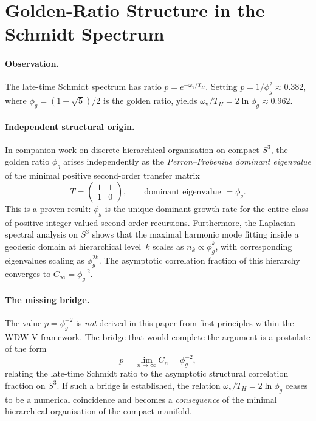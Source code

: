 \documentclass[12pt,a4paper]{article}
\theoremstyle{plain}
\theoremstyle{definition}
\newcommand{\omv}{\omega_{\mathrm{v}}}
\begin{document}
\section{Golden-Ratio Structure in the Schmidt Spectrum}
\label{app:golden}

\paragraph{Observation.}
The late-time Schmidt spectrum has ratio $p = e^{-\omv/T_H}$.
Setting $p = 1/\phi_g^2 \approx 0.382$, where
$\phi_g = (1+\sqrt{5})/2$ is the golden ratio, yields
$\omv/T_H = 2\ln\phi_g \approx 0.962$.

\paragraph{Independent structural origin.}
In companion work on discrete hierarchical organisation on compact $S^3$,
the golden ratio $\phi_g$ arises independently as the
\emph{Perron--Frobenius dominant eigenvalue} of the minimal positive
second-order transfer matrix
\[
  T = \begin{pmatrix}1 & 1 \\ 1 & 0\end{pmatrix},
  \qquad
  \text{dominant eigenvalue } = \phi_g.
\]
This is a proven result: $\phi_g$ is the unique dominant growth rate for
the entire class of positive integer-valued second-order recursions.
Furthermore, the Laplacian spectral analysis on $S^3$ shows that the
maximal harmonic mode fitting inside a geodesic domain at hierarchical
level~$k$ scales as $n_k\propto\phi_g^k$, with corresponding eigenvalues
scaling as $\phi_g^{2k}$.  The asymptotic correlation fraction of this
hierarchy converges to $C_\infty = \phi_g^{-2}$.

\paragraph{The missing bridge.}
The value $p = \phi_g^{-2}$ is \emph{not} derived in this paper from first
principles within the WDW-V framework.
The bridge that would complete the argument is a postulate of the form
\[
  p = \lim_{n\to\infty} C_n = \phi_g^{-2},
\]
relating the late-time Schmidt ratio to the asymptotic structural
correlation fraction on $S^3$.
If such a bridge is established, the relation
$\omv/T_H = 2\ln\phi_g$ ceases to be a numerical coincidence and becomes
a \emph{consequence} of the minimal hierarchical organisation of the
compact manifold.
\end{document}
